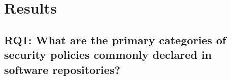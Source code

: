 \section{Results}
\label{4_results}


\subsection{RQ1: What are the primary categories of security policies commonly declared in software repositories?}




